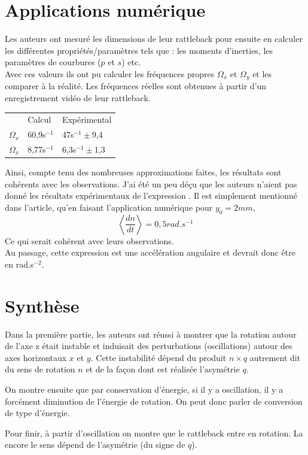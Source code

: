 \documentclass[12pt,a4paper]{article}
\makeatletter
\renewcommand*{\eqref}[1]{%
	\hyperref[{#1}]{\textup{\tagform@{\ref*{#1}}}}%
}
\makeatother
\begin{document}
	\section{Applications numérique}
	Les auteurs ont mesuré les dimensions de leur rattleback pour ensuite en calculer les différentes propriétés/paramètres tels que : les moments d'inerties, les paramètres de courbures ($p$ et $s$) etc.\\
	Avec ces valeurs ils ont pu calculer les fréquences propres $\Omega_x$ et $\Omega_y$ et les comparer à la réalité. Les fréquences réelles sont obtenues à partir d'un enregistrement vidéo de leur rattleback.

	\begin{center}
		\begin{tabular}{lll}
		&	Calcul	&Expérimental\\[4pt]
		$\Omega_x$		&	60,9s$^{-1}$	&47s$^{-1}\pm$9,4\\
		$\Omega_x$		&	8,77s$^{-1}$	&6,3s$^{-1}\pm$1,3
		\end{tabular}
	\end{center}
	Ainsi, compte tenu des nombreuses approximations faites, les résultats sont cohérents avec les observations.
	J'ai été un peu déçu que les auteurs n'aient pas donné les résultats expérimentaux de l'expression \eqref{eq:moyenne-rot}. Il est simplement mentionné dans l'article, qu'en faisant l'application numérique pour $y_0=2mm$,
	$$\left<\dfrac{dn}{dt}\right>=0,5rad.s^{-1}$$
	Ce qui serait cohérent avec leurs observations.\\
	Au passage, cette expression est une accélération angulaire et devrait donc être en rad.s$^{-2}$.
	\section{Synthèse}
	
	Dans la première partie, les auteurs ont réussi à montrer que la rotation autour de l'axe z était instable et induisait des perturbations (oscillations) autour des axes horizontaux $x$ et $y$. Cette instabilité dépend du produit $n\times q$ autrement dit du sens de rotation $n$ et de la façon dont est réalisée l'asymétrie $q$.
	
	On montre ensuite que par conservation d'énergie, si il y a oscillation, il y a forcément diminution de l'énergie de rotation. On peut donc parler de conversion de type d'énergie.
	
	Pour finir, à partir d'oscillation on montre que le rattleback entre en rotation. La encore le sens dépend de l'asymétrie (du signe de $q$).
	
\end{document}
